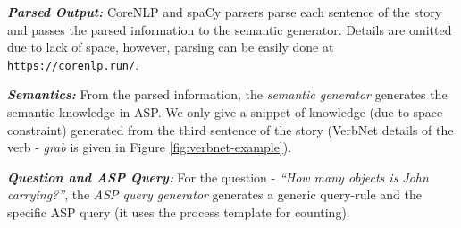 \documentclass[letterpaper]{article}
\begin{document}
\smallskip    
\noindent \textit{\textbf{Parsed Output: }} CoreNLP and spaCy parsers parse each sentence of the story and passes the parsed information to the semantic generator. Details are omitted due to lack of space, however, parsing can be easily done at \texttt{https://corenlp.run/}.

\noindent \textit{\textbf{Semantics: }} 
From the parsed information, the \textit{semantic generator} generates the semantic knowledge in ASP. We only give a snippet of knowledge (due to space constraint) generated from the third sentence of the story (VerbNet details of the verb - \textit{grab} is given in Figure \ref{fig:verbnet-example}).

\smallskip 
\noindent
\cprotect {}

\smallskip

\noindent \textit{\textbf{Question and ASP Query: } }
For the question - \textit{``How many objects is John carrying?''}, the\textit{ ASP query generator} generates a generic query-rule and the specific ASP query (it uses the process template for counting).


\smallskip
\noindent
\cprotect {}
\end{document}
